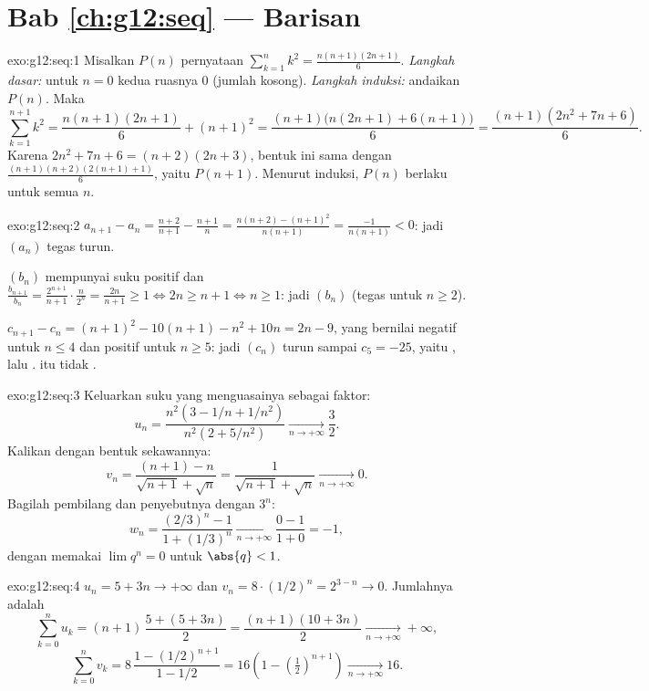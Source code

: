\section*{Bab \ref{ch:g12:seq} --- Barisan}

\begin{solution}{exo:g12:seq:1}
Misalkan $P(n)$ pernyataan $\sum_{k=1}^{n} k^2 = \frac{n(n+1)(2n+1)}{6}$.
\emph{Langkah dasar:} untuk $n = 0$ kedua ruasnya $0$ (jumlah kosong).
\emph{Langkah induksi:} andaikan $P(n)$. Maka
\[
\sum_{k=1}^{n+1} k^2 = \frac{n(n+1)(2n+1)}{6} + (n+1)^2
= \frac{(n+1)\bigl(n(2n+1) + 6(n+1)\bigr)}{6}
= \frac{(n+1)(2n^2 + 7n + 6)}{6}.
\]
Karena $2n^2 + 7n + 6 = (n+2)(2n+3)$, bentuk ini sama dengan
$\frac{(n+1)(n+2)(2(n+1)+1)}{6}$, yaitu $P(n+1)$. Menurut induksi, $P(n)$
berlaku untuk semua $n$.
\end{solution}

\begin{solution}{exo:g12:seq:2}
$a_{n+1} - a_n = \frac{n+2}{n+1} - \frac{n+1}{n}
= \frac{n(n+2) - (n+1)^2}{n(n+1)} = \frac{-1}{n(n+1)} < 0$: jadi $(a_n)$
tegas turun.

$(b_n)$ mempunyai suku positif dan
$\frac{b_{n+1}}{b_n} = \frac{2^{n+1}}{n+1}\cdot\frac{n}{2^n} =
\frac{2n}{n+1} \geq 1 \iff 2n \geq n+1 \iff n \geq 1$: jadi $(b_n)$ 
(tegas untuk $n \geq 2$).

$c_{n+1} - c_n = (n+1)^2 - 10(n+1) - n^2 + 10n = 2n - 9$, yang bernilai negatif
untuk $n \leq 4$ dan positif untuk $n \geq 5$: jadi $(c_n)$ turun sampai
$c_5 = -25$, yaitu , lalu .  itu tidak .
\end{solution}

\begin{solution}{exo:g12:seq:3}
Keluarkan suku yang menguasainya sebagai faktor:
\[
u_n = \frac{n^2(3 - 1/n + 1/n^2)}{n^2(2 + 5/n^2)} \xrightarrow[n\to+\infty]{} \frac{3}{2}.
\]
Kalikan dengan bentuk sekawannya:
\[
v_n = \frac{(n+1) - n}{\sqrt{n+1} + \sqrt{n}} = \frac{1}{\sqrt{n+1}+\sqrt{n}}
\xrightarrow[n\to+\infty]{} 0.
\]
Bagilah pembilang dan penyebutnya dengan $3^n$:
\[
w_n = \frac{(2/3)^n - 1}{1 + (1/3)^n} \xrightarrow[n\to+\infty]{} \frac{0-1}{1+0} = -1,
\]
dengan memakai $\lim q^n = 0$ untuk $\abs{q} < 1$.
\end{solution}

\begin{solution}{exo:g12:seq:4}
$u_n = 5 + 3n \to +\infty$ dan $v_n = 8 \cdot (1/2)^n = 2^{3-n} \to 0$.
Jumlahnya adalah
\[
\sum_{k=0}^{n} u_k = (n+1)\,\frac{5 + (5+3n)}{2} = \frac{(n+1)(10+3n)}{2}
\xrightarrow[n\to+\infty]{} +\infty,
\]
\[
\sum_{k=0}^{n} v_k = 8\,\frac{1 - (1/2)^{n+1}}{1 - 1/2}
= 16\left(1 - \left(\tfrac{1}{2}\right)^{n+1}\right)
\xrightarrow[n\to+\infty]{} 16 .
\]
\end{solution}

